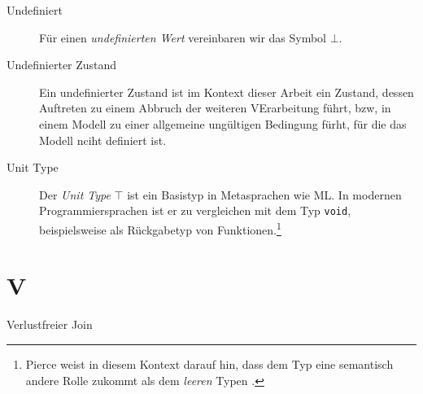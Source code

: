 \begin{description}
    \item[Undefiniert]
    Für einen \textit{undefinierten Wert} vereinbaren wir das Symbol $\bot$.
\end{description}

\begin{description}
    \item[Undefinierter Zustand]
    Ein undefinierter Zustand ist im Kontext dieser Arbeit ein Zustand, dessen Auftreten zu einem Abbruch der weiteren VErarbeitung führt, bzw, in einem Modell zu einer allgemeine ungültigen Bedingung fürht, für die das Modell nciht definiert ist.
\end{description}

\begin{description}
    \item[Unit Type \top]
    Der \textit{Unit Type} $\top$ ist ein Basistyp in Metasprachen wie ML.
    In modernen Programmiersprachen ist er zu vergleichen mit dem Typ \texttt{void}, beispielsweise als
    Rückgabetyp von Funktionen.\footnote{
        Pierce weist in diesem Kontext darauf hin, dass dem Typ eine semantisch andere Rolle zukommt als dem \textit{leeren} Typen \bot.
    }
\end{description}

\section*{V}


\begin{description}
    \item[Verlustfreier Join]
\end{description}